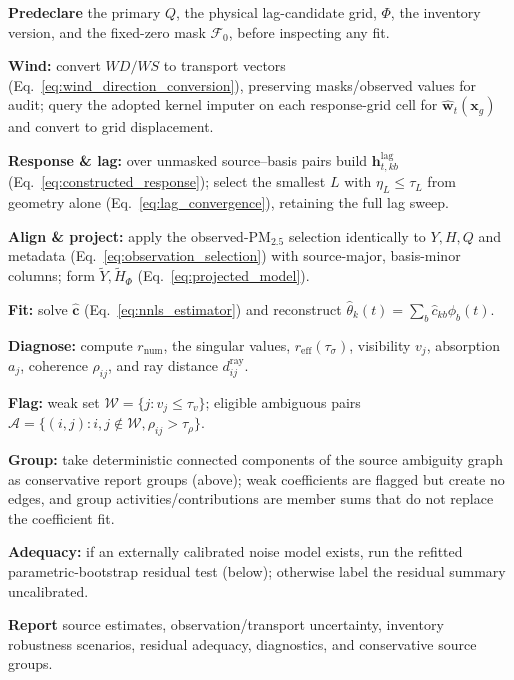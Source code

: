 \begin{algorithm}[t]
\caption{Identifiability-Aware Source Apportionment}
\label{alg:iasa}
\footnotesize
\begin{algsteps}
  \item \textbf{Predeclare} the primary \(Q\), the physical lag-candidate grid,
  \(\Phi\), the inventory version, and the fixed-zero mask \(\mathcal F_0\),
  before inspecting any fit.
  \item \textbf{Wind:} convert \(\mathit{WD}/\mathit{WS}\) to transport vectors
  (Eq.~\ref{eq:wind_direction_conversion}), preserving masks/observed values for
  audit; query the adopted kernel imputer on each response-grid cell for
  \(\widehat{\mathbf w}_t(\mathbf x_g)\) and convert to grid displacement.
  \item \textbf{Response \& lag:} over unmasked source--basis pairs build
  \(\mathbf h_{t,kb}^{\mathrm{lag}}\) (Eq.~\ref{eq:constructed_response}); select
  the smallest \(L\) with \(\eta_L\le\tau_L\) from geometry alone
  (Eq.~\ref{eq:lag_convergence}), retaining the full lag sweep.
  \item \textbf{Align \& project:} apply the observed-PM\(_{2.5}\) selection
  identically to \(Y,H,Q\) and metadata (Eq.~\ref{eq:observation_selection}) with
  source-major, basis-minor columns; form \(\widetilde Y,\widetilde H_\Phi\)
  (Eq.~\ref{eq:projected_model}).
  \item \textbf{Fit:} solve \(\widehat{\mathbf c}\)
  (Eq.~\ref{eq:nnls_estimator}) and reconstruct
  \(\widehat\theta_k(t)=\sum_b\widehat c_{kb}\phi_b(t)\).
  \item \textbf{Diagnose:} compute \(r_{\mathrm{num}}\), the singular values,
  \(r_{\mathrm{eff}}(\tau_\sigma)\), visibility \(v_j\), absorption \(a_j\),
  coherence \(\rho_{ij}\), and ray distance \(d^{\mathrm{ray}}_{ij}\).
  \item \textbf{Flag:} weak set \(\mathcal W=\{j:v_j\le\tau_v\}\); eligible
  ambiguous pairs \(\mathcal A=\{(i,j):i,j\notin\mathcal W,\rho_{ij}>\tau_\rho\}\).
  \item \textbf{Group:} take deterministic connected components of the source
  ambiguity graph as conservative report groups
  (above); weak coefficients are flagged but create no
  edges, and group activities/contributions are member sums that do not replace
  the coefficient fit.
  \item \textbf{Adequacy:} if an externally calibrated noise model exists, run
  the refitted parametric-bootstrap residual test
  (below); otherwise label the residual summary
  uncalibrated.
  \item \textbf{Report} source estimates, observation/transport uncertainty,
  inventory robustness scenarios, residual adequacy, diagnostics, and
  conservative source groups.
\end{algsteps}
\end{algorithm}

